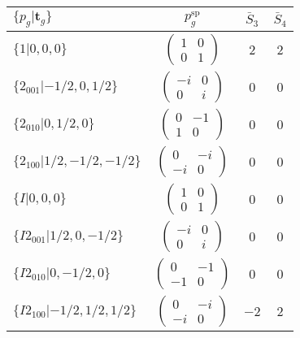 \documentclass[3p,preprint]{elsarticle}
\newcommand{\bt}{\bm{t}}
\begin{document}
\begin{table}[H]
		\begin{tabular}{|l|c||c|c|}\hline
			$\{p_g|\bt_g\}$ & $p_g^{\text{sp}}$ & $\bar{S}_3$ & $\bar{S}_4$  \\ \hline \hline
			$\{1|0,0,0\}$ & 					$\left(\begin{array}{cc} 1&0 \\ 0&1 \end{array}\right)$	& $2$ &  $2$ \\ \hline
			$\{2_{001}|-1/2,0,1/2\}$ &		$\left(\begin{array}{cc} -i&0 \\ 0&i \end{array}\right)$	& $0$ & $0$  \\ \hline
			$\{2_{010}|0,1/2,0\}$ &			$\left(\begin{array}{cc} 0&-1 \\ 1&0 \end{array}\right)$	& $0$ & $0$\\ \hline
			$\{2_{100}|1/2,-1/2,-1/2\}$ &		$\left(\begin{array}{cc} 0&-i \\ -i&0 \end{array}\right)$	& $0$ & $0$\\ \hline
			$\{I|0,0,0\}$ & 						$\left(\begin{array}{cc} 1&0 \\ 0&1 \end{array}\right)$	& $0$ &  $0$\\ \hline
			$\{I2_{001}|1/2,0,-1/2\}$ &		$\left(\begin{array}{cc} -i&0 \\ 0&i \end{array}\right)$	& $0$ & $0$  \\ \hline
			$\{I2_{010}|0,-1/2,0\}$ &			$\left(\begin{array}{cc} 0&-1 \\ -1&0 \end{array}\right)$	& $0$ & $0$\\ \hline
			$\{I2_{100}|-1/2,1/2,1/2\}$ &		$\left(\begin{array}{cc} 0&-i \\ -i&0 \end{array}\right)$	& $-2$ & $2$\\ \hline
	\end{tabular}
\end{table}
\end{document}
